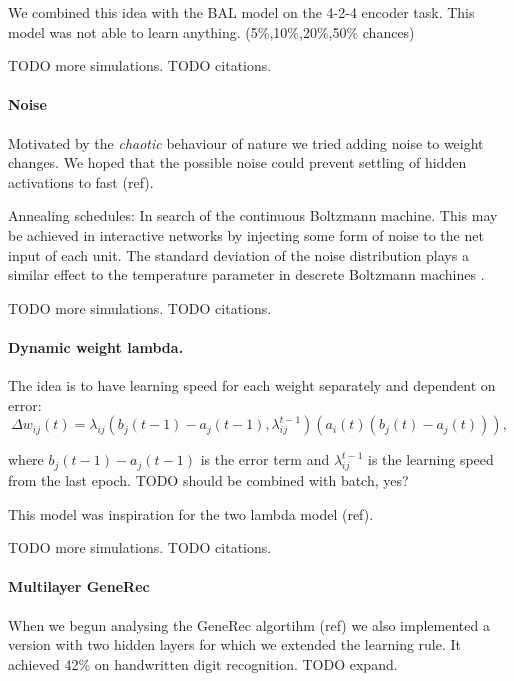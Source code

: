 We combined this idea with the BAL model on the 4-2-4 encoder task. This model was not able to learn anything. 
(5\%,10\%,20\%,50\% chances)

TODO more simulations. 
TODO citations.  

\paragraph{Noise} 

Motivated by the \emph{chaotic} behaviour of nature we tried adding noise to weight changes. We hoped that the possible noise could prevent settling of hidden activations to fast (ref). 

Annealing schedules: In search of the continuous Boltzmann machine. This may be achieved in interactive networks by injecting some form of noise to the net input of each unit. The standard deviation of the noise distribution plays a similar effect to the temperature parameter in descrete Boltzmann machines \citet{movellan1990contrastive}. 

TODO more simulations. 
TODO citations.  

\paragraph{Dynamic weight lambda.} 

The idea is to have learning speed for each weight separately and dependent on error: 
\begin{equation}
\Delta w_{ij}(t) = \lambda_{ij}(b_j(t-1) - a_j(t-1), \lambda_{ij}^{t-1})(a_i(t)(b_j(t) - a_j(t))),
\end{equation}

where $b_j(t-1) - a_j(t-1)$ is the error term and $\lambda_{ij}^{t-1}$ is the learning speed from the last epoch. 
TODO should be combined with batch, yes? 

This model was inspiration for the two lambda model (ref). 

TODO more simulations. 
TODO citations.  

\paragraph{Multilayer GeneRec}

When we begun analysing the GeneRec algortihm (ref) we also implemented a version with two hidden layers for which we extended the learning rule. It achieved 42\% on handwritten digit recognition. 
TODO expand. 



